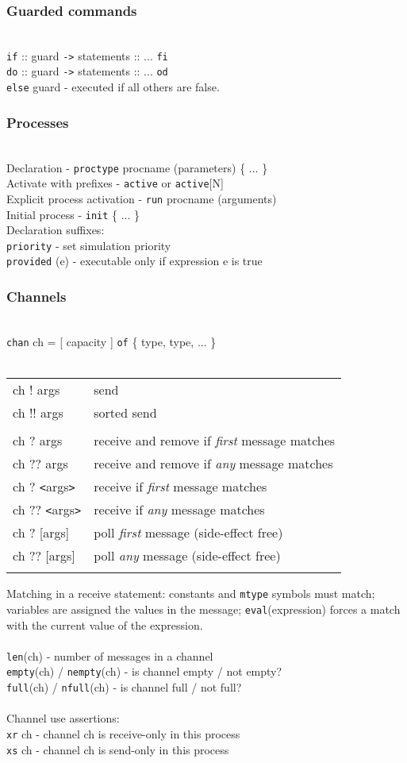 \documentclass{leaflet}
\newcommand{\sct}[1]{\subsubsection{#1}\mbox{}\\}
\newcommand{\spc}{\hspace*{1.5em}}
\begin{document}
\sct{Guarded commands}
\texttt{if} :: guard \verb=->= statements :: ... \texttt{fi}\\
\texttt{do} :: guard \verb=->= statements :: ... \texttt{od}\\
\texttt{else} guard - executed if all others are false.

\sct{Processes}
Declaration - \texttt{proctype} procname (parameters) \{ ... \}\\
Activate with prefixes - \texttt{active} or \texttt{active}[N]\\
Explicit process activation - \texttt{run} procname (arguments)\\
Initial process - \texttt{init} \{ ... \}\\
Declaration suffixes:\\
\spc{}\texttt{priority} - set simulation priority\\
\spc{}\texttt{provided} (e) - executable only if expression e is true

\sct{Channels}
\texttt{chan} ch = [ capacity ] \texttt{of} \{ type, type, ... \}\\
\\
\begin{tabular}{@{\hspace*{0pt}}ll}
ch ! args & send\\
ch !! args & sorted send\\
\\
ch ? args & receive and remove if \emph{first} message matches\\ 
ch ?? args & receive and remove if \emph{any} message matches\\ 
ch ? \verb+<+args\verb+>+ & receive if \emph{first} message matches\\ 
ch ?? \verb+<+args\verb+>+ & receive if \emph{any} message matches\\ 
ch ? [args] & poll \emph{first} message (side-effect free)\\ 
ch ?? [args] & poll \emph{any} message (side-effect free)\\
\\
\end{tabular}
Matching in a receive statement: constants and \texttt{mtype} symbols must match;
variables are assigned the values in the message; 
\texttt{eval}(expression) forces a match with the current
value of the expression.\\
\\
\texttt{len}(ch) - number of messages in a channel\\
\texttt{empty}(ch) / \texttt{nempty}(ch) - is channel empty / not empty?\\
\texttt{full}(ch) / \texttt{nfull}(ch) - is channel full / not full?\\
\\
Channel use assertions:\\
\spc{}\texttt{xr} ch - channel ch is receive-only in this process\\
\spc{}\texttt{xs} ch - channel ch is send-only in this process
\end{document}
